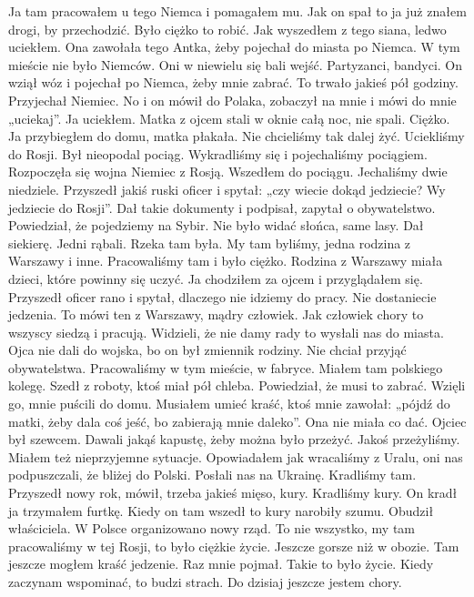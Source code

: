  Ja tam pracowałem u tego Niemca i pomagałem mu.  Jak on spał to ja już znałem drogi,        by przechodzić. Było ciężko to robić. Jak wyszedłem z tego siana, ledwo uciekłem. Ona zawołała tego Antka, żeby pojechał do miasta po Niemca. W tym mieście nie było Niemców. Oni w niewielu się bali wejść. Partyzanci, bandyci. On wziął wóz i pojechał po Niemca, żeby mnie zabrać. To trwało jakieś pół godziny. Przyjechał Niemiec. No i on mówił do Polaka, zobaczył na mnie i mówi do mnie „uciekaj”.    Ja uciekłem. Matka z ojcem stali w oknie całą noc, nie spali. Ciężko. Ja przybiegłem do domu, matka płakała. Nie chcieliśmy tak dalej żyć. Uciekliśmy do Rosji. Był nieopodal pociąg. Wykradliśmy się           i pojechaliśmy pociągiem. Rozpoczęła się wojna Niemiec z Rosją. Wszedłem do pociągu. Jechaliśmy dwie niedziele. Przyszedł jakiś ruski oficer i spytał: „czy wiecie dokąd jedziecie? Wy jedziecie do Rosji”. Dał takie dokumenty i podpisał, zapytał o obywatelstwo. Powiedział, że pojedziemy na Sybir. Nie było widać słońca, same lasy. Dał siekierę. Jedni rąbali. Rzeka tam była. My tam byliśmy, jedna rodzina z Warszawy i inne. Pracowaliśmy tam i było ciężko. Rodzina z Warszawy miała dzieci, które powinny się uczyć. Ja chodziłem za ojcem i przyglądałem się. Przyszedł oficer rano i spytał, dlaczego nie idziemy do pracy. Nie dostaniecie jedzenia. To mówi ten z Warszawy, mądry człowiek.                 Jak człowiek chory to wszyscy siedzą i pracują. Widzieli, że nie damy rady to wysłali nas do miasta. Ojca nie dali do wojska, bo on był zmiennik rodziny. Nie chciał przyjąć obywatelstwa. Pracowaliśmy w tym mieście, w fabryce. Miałem tam polskiego kolegę. Szedł z roboty, ktoś miał pół chleba. Powiedział, że musi to zabrać. Wzięli go, mnie puścili do domu. Musiałem umieć kraść, ktoś mnie zawołał:  „pójdź do matki, żeby dala coś jeść, bo zabierają mnie daleko”. Ona nie miała co dać. Ojciec był szewcem. Dawali jakąś kapustę,  żeby można było przeżyć. Jakoś przeżyliśmy. Miałem też nieprzyjemne sytuacje. Opowiadałem jak wracaliśmy z Uralu, oni nas podpuszczali, że bliżej do Polski. Posłali nas na Ukrainę. Kradliśmy tam. Przyszedł nowy rok, mówił, trzeba jakieś mięso, kury. Kradliśmy kury. On kradł ja trzymałem furtkę. Kiedy on tam wszedł to kury narobiły szumu. Obudził właściciela. W Polsce organizowano nowy rząd. To nie wszystko, my tam pracowaliśmy w tej Rosji, to było ciężkie życie. Jeszcze gorsze niż w obozie. Tam jeszcze mogłem kraść jedzenie. Raz mnie pojmał. Takie to było życie. Kiedy zaczynam wspominać, to budzi strach. Do dzisiaj jeszcze jestem chory.  

